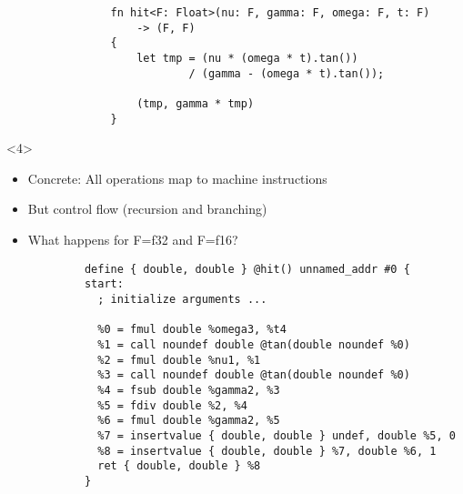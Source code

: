 \documentclass[11pt]{beamer}
\begin{document}
\begin{frame}[fragile]
\begin{onlyenv}
\begin{minipage}{.50\linewidth}
\begin{verbatim}
				fn hit<F: Float>(nu: F, gamma: F, omega: F, t: F) 
					-> (F, F)
				{
					let tmp = (nu * (omega * t).tan()) 
						    / (gamma - (omega * t).tan());

					(tmp, gamma * tmp)
				}
			\end{verbatim}
		\end{minipage}
	\end{onlyenv}

	\begin{onlyenv}
		\begin{minipage}{.45\linewidth}
			\begin{itemize}
				\item Concrete: All operations map to machine instructions
				\item But control flow (recursion and branching)
				\item What happens for F=f32 and F=f16?
			\end{itemize}
		\end{minipage}
		\hfill
		\begin{minipage}{.48\linewidth}
			\tiny
			\begin{verbatim}
			define { double, double } @hit() unnamed_addr #0 {
			start:
			  ; initialize arguments ...

			  %0 = fmul double %omega3, %t4
			  %1 = call noundef double @tan(double noundef %0)
			  %2 = fmul double %nu1, %1
			  %3 = call noundef double @tan(double noundef %0)
			  %4 = fsub double %gamma2, %3
			  %5 = fdiv double %2, %4
			  %6 = fmul double %gamma2, %5
			  %7 = insertvalue { double, double } undef, double %5, 0
			  %8 = insertvalue { double, double } %7, double %6, 1
			  ret { double, double } %8
			}
			\end{verbatim}
		\end{minipage}
	\end{onlyenv}


\end{frame}
\end{document}
